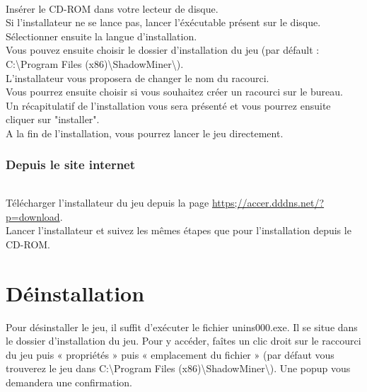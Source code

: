\documentclass[titlepage, 11px, a4paper]{report}
\begin{document}
\paragraph*{} \hspace{0pt}
Insérer le CD-ROM dans votre lecteur de disque. \\
Si l'installateur ne se lance pas, lancer l'éxécutable présent sur le disque. \\
Sélectionner ensuite la langue d'installation. \\
Vous pouvez ensuite choisir le dossier d'installation du jeu 
(par défault : C:\textbackslash Program Files (x86)\textbackslash ShadowMiner\textbackslash). \\
L'installateur vous proposera de changer le nom du racourci. \\
Vous pourrez ensuite choisir si vous souhaitez créer un racourci sur le bureau. \\
Un récapitulatif de l'installation vous sera présenté et vous pourrez ensuite cliquer sur "installer". \\
A la fin de l'installation, vous pourrez lancer le jeu directement. \\

\section{Depuis le site internet}
\paragraph*{} \hspace{0pt}
Télécharger l'installateur du jeu depuis la page \url{https;//accer.dddns.net/?p=download}. \\
Lancer l'installateur et suivez les mêmes étapes que pour l'installation depuis le CD-ROM. \\



\newpage


\part{Déinstallation} 

Pour désinstaller le jeu, il suffit d'exécuter le fichier unins000.exe. 
Il se situe dans le dossier d'installation du jeu. Pour y accéder, faîtes un clic droit sur le 
raccourci du jeu puis « propriétés » puis « emplacement du fichier » (par défaut vous trouverez le jeu dans 
C:\textbackslash Program Files (x86)\textbackslash ShadowMiner\textbackslash). 
Une popup vous demandera une confirmation.\\
\end{document}
